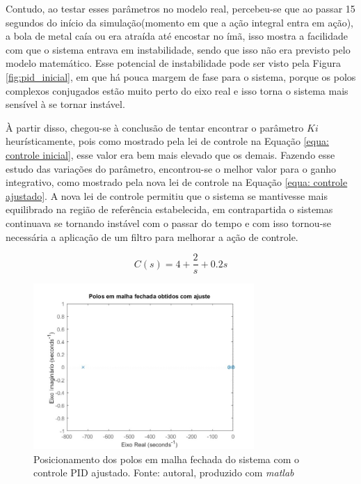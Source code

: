 \documentclass{ifacconf}
\begin{document}
Contudo, ao testar esses parâmetros no modelo real, percebeu-se que ao passar 15 segundos do início da simulação(momento em que a ação integral entra em ação),
a bola de metal caía ou era atraída até encostar no ímã, isso mostra a facilidade com que o sistema entrava em instabilidade, sendo que isso não era previsto pelo modelo matemático. Esse 
potencial de instabilidade pode ser visto pela Figura \ref{fig:pid_inicial}, em que há pouca margem de fase para o sistema, porque os polos complexos conjugados estão muito perto do eixo 
real e isso torna o sistema mais sensível à se tornar instável.

À partir disso, chegou-se à conclusão de tentar encontrar o parâmetro $Ki$ heurísticamente, pois como mostrado pela lei de controle na Equação \ref{equa: controle inicial}, esse valor era bem mais elevado que os demais. 
Fazendo esse estudo das variações do parâmetro, encontrou-se o melhor valor para o ganho integrativo, como mostrado pela nova lei de controle na Equação \ref{equa: controle ajustado}. A nova lei de controle permitiu que 
o sistema se mantivesse mais equilibrado na região de referência estabelecida, em contrapartida o sistemas continuava se tornando instável com o passar do tempo e com isso tornou-se necessária 
a aplicação de um filtro para melhorar a ação de controle.

\begin{equation}
  C(s) = 4 + \frac{2}{s} + 0.2s
  \label{equa: controle ajustado}
\end{equation}

\begin{figure}[!htb]
  \begin{center}
  \includegraphics[width=8.4cm]{figures/lei pid ajuste.jpg}    %
  \caption{Posicionamento dos polos em malha fechada do sistema com o controle PID ajustado. Fonte: autoral, produzido com \textit{matlab}} 
  \label{fig:pid_ajustado}
  \end{center}
\end{figure}
\end{document}
